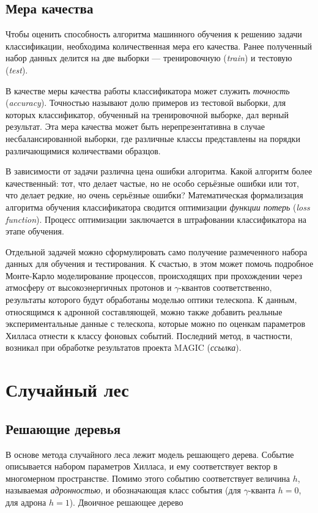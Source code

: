 \documentclass[magd,floatypics,numeref]{msudipl} %
\begin{document}
\subsection{Мера качества}
Чтобы оценить способность алгоритма машинного обучения к решению задачи классификации, необходима количественная мера его качества. Ранее полученный набор данных делится на две выборки --- тренировочную (\textit{train}) и тестовую (\textit{test}). 

В качестве меры качества работы классификатора может служить \textit{точность} (\textit{accuracy}). Точностью называют долю примеров из тестовой выборки, для которых классификатор, обученный на тренировочной выборке, дал верный результат.  Эта мера качества может быть нерепрезентативна в случае несбалансированной выборки, где различные классы представлены на порядки различающимися количествами образцов. 

В зависимости от задачи различна цена ошибки алгоритма. Какой алгоритм более качественный: тот, что делает частые, но не особо серьёзные ошибки или тот, что делает редкие, но очень серьёзные ошибки? Математическая формализация алгоритма обучения классификатора сводится оптимизации \textit{функции потерь} (\textit{loss function}). Процесс оптимизации заключается в штрафовании классификатора на этапе обучения.

Отдельной задачей можно сформулировать само получение размеченного набора данных для обучения и тестирования. К счастью, в этом может помочь подробное Монте-Карло моделирование процессов, происходящих при прохождении через атмосферу от высокоэнергичных протонов и $\gamma$-квантов соответственно, результаты которого будут обработаны моделью оптики телескопа. К данным, относящимся к адронной составляющей, можно также добавить реальные экспериментальные данные с телескопа, которые можно по оценкам параметров Хилласа отнести к классу фоновых событий. Последний метод, в частности, возникал при обработке результатов проекта MAGIC (\textit{ссылка}).

\section{Случайный лес}
\subsection{Решающие деревья}
В основе метода случайного леса лежит модель решающего дерева. Событие описывается набором параметров Хилласа, и ему соответствует вектор в многомерном пространстве. Помимо этого событию соответствует величина $h$, называемая \textit{адронностью}, и обозначающая класс события (для $\gamma$-кванта $h=0$, для адрона $h = 1$). Двоичное решающее дерево 
\end{document}
